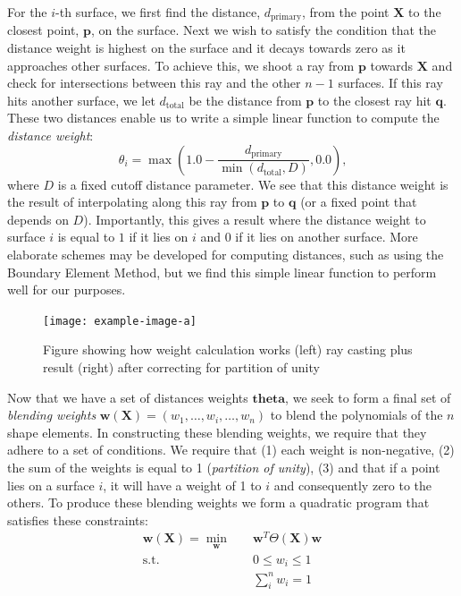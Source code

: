 For the $i$-th surface, we first find the distance, $d_{\text{primary}}$, from the point $\mathbf{X}$ to the closest point, $\mathbf{p}$, on the surface. Next we wish to satisfy the condition that the distance weight is highest on the surface and it decays towards zero as it approaches other surfaces. To achieve this, we shoot a ray from $\mathbf{p}$ towards $\mathbf{X}$ and check for intersections between this ray and the other $n-1$ surfaces. If this ray hits another surface, we let $d_{\text{total}}$ be the distance from $\mathbf{p}$ to the closest ray hit $\mathbf{q}$. These two distances enable us to write a simple linear function to compute the \textit{distance weight}:
\begin{equation}
\theta_i = \max (1.0 - \frac{d_{\text{primary}}}{\min (d_{\text{total}}, D)}, 0.0)
\text{,}
\end{equation}
where $D$ is a fixed cutoff distance parameter. We see that this distance weight is the result of interpolating along this ray from $\mathbf{p}$ to $\mathbf{q}$ (or a fixed point that depends on $D$). Importantly, this gives a result where the distance weight to surface $i$ is equal to $1$ if it lies on $i$ and $0$ if it lies on another surface. More elaborate schemes may be developed for computing distances, such as using the Boundary Element Method, but we find this simple linear function to perform well for our purposes.

\begin{figure}
    \texttt{[image: example-image-a]}
    \caption{Figure showing how weight calculation works (left) ray casting plus result (right) after correcting for partition of unity}
    \label{fig:weightcompute}
\end{figure}

Now that we have a set of distances weights $\mathbf{theta}$, we seek to form a final set of \textit{blending weights} $\mathbf{w}(\mathbf{X}) =  \left( w_1, \dots, w_i, \dots, w_n \right)$ to blend the polynomials of the $n$ shape elements. In constructing these blending weights, we require that they adhere to a set of conditions. We require that (1) each weight is non-negative, (2) the sum of the weights is equal to 1 (\textit{partition of unity}), (3) and that if a point lies on a surface $i$, it will have a weight of 1 to $i$ and consequently zero to the others. To produce these blending weights we form a quadratic program that satisfies these constraints:
\begin{equation}
\begin{aligned}
\mathbf{w}(\mathbf{X}) = \min_{\mathbf{w}} \quad & \mathbf{w}^T \Theta(\mathbf{X}) \mathbf{w}    \\
\textrm{s.t.} \quad & 0 \leq w_i \leq 1                     \\
                    &   \sum_i^n w_i = 1                      \\
\end{aligned}
\end{equation}

